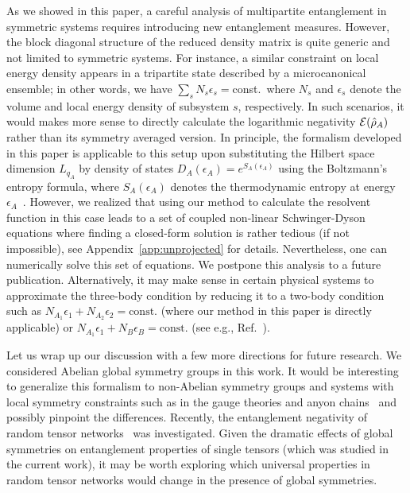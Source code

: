 \documentclass[aps,pra,reprint,superscriptaddress,twocolumn,notitlepage]{revtex4-1}
\numberwithin{equation}{section}
\begin{document}
As we showed in this paper, a careful analysis of multipartite entanglement in symmetric systems requires introducing new entanglement measures. However, the block diagonal structure of the reduced density matrix is quite generic and not limited to symmetric systems. For instance, a similar constraint on local energy density appears in a tripartite state described by a microcanonical ensemble; in other words, we have $\sum_s N_s \epsilon_s = $const.~where $N_s$ and $\epsilon_s$ denote the volume and local energy density of subsystem $s$, respectively. In such scenarios, it would makes more sense to directly calculate the logarithmic negativity ${\cal E}(\hat\rho_A)$ rather than its symmetry averaged version. In principle, the formalism developed in this paper is applicable to this setup upon substituting the Hilbert space dimension $L_{q_A}$ by density of states $D_A(\epsilon_A)= e^{S_A(\epsilon_A)}$ using the Boltzmann's entropy formula, where $S_A(\epsilon_A)$ denotes the thermodynamic entropy at energy $\epsilon_A$~\cite{murthy2019structure, Grover2020}.
However, we realized that using our method to calculate the resolvent function in this case leads to a set of coupled non-linear Schwinger-Dyson equations where finding a closed-form solution is rather tedious (if not impossible), see Appendix~\ref{app:unprojected} for details. Nevertheless, one can numerically solve this set of equations. We postpone this analysis to a future publication. Alternatively, it may make sense in certain physical systems to approximate the three-body condition by reducing it to a two-body condition such as $N_{A_1}\epsilon_1 + N_{A_2}\epsilon_2= \text{const.}$ (where our method in this paper is directly applicable) or $N_{A_1}\epsilon_1 + N_{B}\epsilon_B= \text{const.}$ (see e.g., Ref.~\cite{Vardhan2021}). 

Let us wrap up our discussion with a few more directions for future research.
We considered Abelian global symmetry groups in this work. It would be interesting to generalize this formalism to non-Abelian symmetry groups and systems with local symmetry constraints such as in the gauge theories and anyon chains~\cite{PhysRevLett.124.050602} and possibly pinpoint the differences.
Recently, the entanglement negativity of random tensor networks~\cite{Dong-Qi-2021,Dong2021,KudlerFlam2021_neg} was investigated. Given the dramatic effects of global symmetries on entanglement properties of single tensors (which was studied in the current work), it may be worth exploring which universal properties in random tensor networks would change in the presence of global symmetries.
\end{document}
